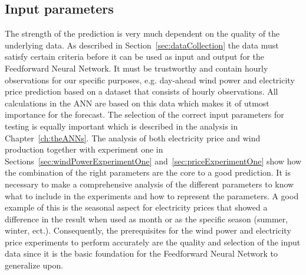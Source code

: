 \subsection{Input parameters}
The strength of the prediction is very much dependent on the quality of the underlying data. As described in Section~\ref{sec:dataCollection} the data must satisfy certain criteria before it can be used as input and output for the Feedforward Neural Network. It must be trustworthy and contain hourly observations for our specific purposes, e.g. day-ahead wind power and electricity price prediction based on a dataset that consists of hourly observations. All calculations in the ANN are based on this data which makes it of utmost importance for the forecast. The selection of the correct input parameters for testing is equally important which is described in the analysis in Chapter~\ref{ch:theANNs}. The analysis of both electricity price and wind production together with experiment one in Sections~\ref{sec:windPowerExperimentOne} and~\ref{sec:priceExperimentOne} show how the combination of the right parameters are the core to a good prediction. It is necessary to make a comprehensive analysis of the different parameters to know what to include in the experiments and how to represent the parameters. A good example of this is the seasonal aspect for electricity prices that showed a difference in the result when used as month or as the specific season (summer, winter, ect.). Consequently, the prerequisites for the wind power and electricity price experiments to perform accurately are the quality and selection of the input data since it is the basic foundation for the Feedforward Neural Network to generalize upon.


